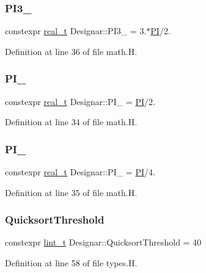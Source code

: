 \subsubsection{\texorpdfstring{P\+I3\+\_}{PI3\_2}}
{\footnotesize\ttfamily constexpr \hyperlink{namespace_designar_aca2c32af26808dbec1f3a3071fad25ce}{real\+\_\+t} Designar\+::\+P\+I3\+\_ = 3.$\ast$\hyperlink{namespace_designar_a2085e876f193b2212cd11dd2770b2d0b}{PI}/2.}



Definition at line 36 of file math.\+H.

\mbox{\label{namespace_designar_a06ae46c26bfae21d3284882e3f5b9f60}} 
\subsubsection{\texorpdfstring{P\+I\+\_}{PI\_2}}
{\footnotesize\ttfamily constexpr \hyperlink{namespace_designar_aca2c32af26808dbec1f3a3071fad25ce}{real\+\_\+t} Designar\+::\+P\+I\+\_ = \hyperlink{namespace_designar_a2085e876f193b2212cd11dd2770b2d0b}{PI}/2.}



Definition at line 34 of file math.\+H.

\mbox{\label{namespace_designar_a5d073eb77d1d0886610584ee1441d8de}} 
\subsubsection{\texorpdfstring{P\+I\+\_}{PI\_4}}
{\footnotesize\ttfamily constexpr \hyperlink{namespace_designar_aca2c32af26808dbec1f3a3071fad25ce}{real\+\_\+t} Designar\+::\+P\+I\+\_ = \hyperlink{namespace_designar_a2085e876f193b2212cd11dd2770b2d0b}{PI}/4.}



Definition at line 35 of file math.\+H.

\mbox{\label{namespace_designar_a62c201985e06bb7419a888d5d2b7bde8}} 
\subsubsection{\texorpdfstring{Quicksort\+Threshold}{QuicksortThreshold}}
{\footnotesize\ttfamily constexpr \hyperlink{namespace_designar_a9d113d66a39e82b73727c72cd3a52f73}{lint\+\_\+t} Designar\+::\+Quicksort\+Threshold = 40}



Definition at line 58 of file types.\+H.

